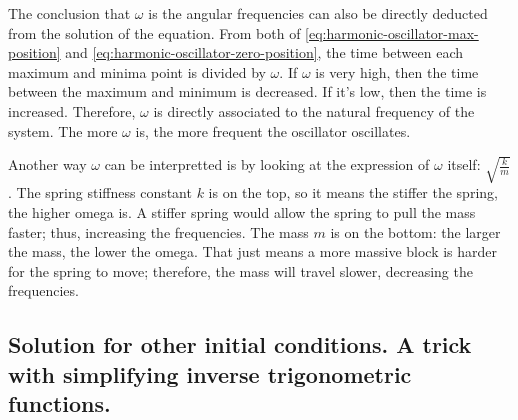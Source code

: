 The conclusion that $\omega$ is the angular frequencies can also be directly deducted from the solution of the equation. From both of \cref{eq:harmonic-oscillator-max-position} and \cref{eq:harmonic-oscillator-zero-position}, the time between each maximum and minima point is divided by $\omega$. If $\omega$ is very high, then the time between the maximum and minimum is decreased. If it's low, then the time is increased. Therefore, $\omega$ is directly associated to the natural frequency of the system. The more $\omega$ is, the more frequent the oscillator oscillates.

Another way $\omega$ can be interpretted is by looking at the expression of $\omega$ itself: $\sqrt{\frac{k}{m}}$. The spring stiffness constant $k$ is on the top, so it means the stiffer the spring, the higher omega is. A stiffer spring would allow the spring to pull the mass faster; thus, increasing the frequencies. The mass $m$ is on the bottom: the larger the mass, the lower the omega. That just means a more massive block is harder for the spring to move; therefore, the mass will travel slower, decreasing the frequencies.

\subsection{Solution for other initial conditions. A trick with simplifying inverse trigonometric functions.}

